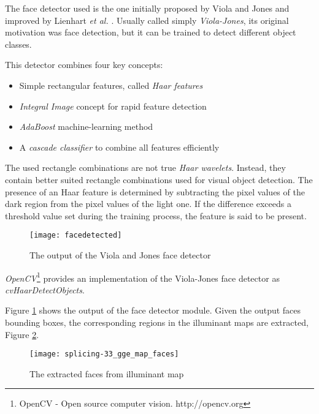 The face detector used is the one initially proposed by Viola and Jones \cite{viola2001rapid}\cite{viola2004robust} and improved by Lienhart \emph{et al.} \cite{lienhart2002extended}. Usually called simply \emph{Viola-Jones}, its original motivation was face detection, but it can be trained to detect different object classes. 

This detector combines four key concepts: 
\begin{itemize}
\item Simple rectangular features, called \emph{Haar features}
\item \emph{Integral Image}\cite{crow1984summed} concept for rapid feature detection 
\item \emph{AdaBoost}\cite{freund1995desicion} machine-learning method 
\item A \emph{cascade classifier} to combine all features efficiently 
\end{itemize}

The used rectangle combinations are not true \emph{Haar wavelets}\cite{haar1910theorie}. Instead, they contain better suited rectangle combinations used for visual object detection. The presence of an Haar feature is determined by subtracting the pixel values of the dark region from the pixel values of the light one. If the difference exceeds a threshold value set during the training process, the feature is said to be present. 

\begin{figure}[h!]
\vspace{1cm}
  \centering
    \texttt{[image: facedetected]}
    \caption{The output of the Viola and Jones face detector}
    \label{fig:facesdetected}
\end{figure}

\emph{OpenCV}\footnote{OpenCV - Open source computer vision. http://opencv.org} provides an implementation of the Viola-Jones face detector as \emph{cvHaarDetectObjects}.

Figure \ref{fig:facesdetected} shows the output of the face detector module. Given the output faces bounding boxes, the corresponding regions in the illuminant maps are extracted, Figure \ref{fig:facesdetectedmaps}.

\begin{figure}[h!]
	\vspace{1cm}
  \centering
    \texttt{[image: splicing-33\_gge\_map\_faces]}
    \caption{The extracted faces from illuminant map}
    \label{fig:facesdetectedmaps}
\end{figure}

